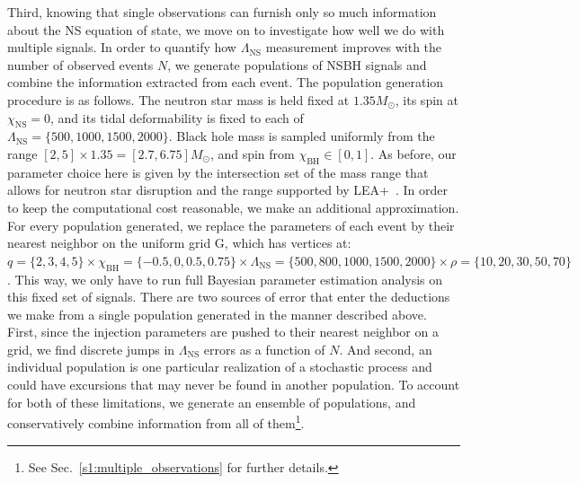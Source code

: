 \documentclass[aps,prd,amsmath,floats,floatfix, twocolumn,
superscriptaddress,nofootinbib,showpacs]{revtex4-1}
\newcommand{\prayush}{\textcolor{red!40!black}}
\newcommand{\lambdans}{\Lambda_\mathrm{NS}}
\newcommand{\chibh}{\chi_\mathrm{BH}}
\newcommand{\chins}{\chi_\mathrm{NS}}
\begin{document}
Third, knowing that single observations can furnish only so much information
about the NS equation of state, we move on to investigate how well we do with
multiple signals. In order to quantify how $\lambdans$ measurement improves
with the number of observed events $N$, we generate populations of NSBH signals
and combine the information extracted from each event.
% 
The population generation procedure is as follows. The neutron star mass is
held fixed at $1.35M_\odot$, its spin at $\chins=0$, and its tidal
deformability is fixed to each of $\lambdans=\{500,1000,1500,2000\}$. Black hole
mass is sampled uniformly from the range $[2,5]\times 1.35=[2.7, 6.75]M_\odot$,
and spin from $\chibh\in[0,1]$. As before, our parameter choice here is given
by the intersection set of the mass range that allows for neutron star disruption
and the range supported by LEA+~\cite{Foucart2012,Foucart:2013a,Lackey:2013axa}.
In order to keep the computational cost reasonable, we make an additional
approximation. For every population generated, we replace the parameters of each
event by their nearest neighbor on the uniform grid G, which has vertices
at: $q=\{2,3,4,5\}\times\chibh=\{-0.5,0,0.5,0.75\}\times\lambdans=\{500,800,
1000,1500,2000\}\times\rho=\{10,20,30,50,70\}$.
% 
This way, we only have to run full Bayesian parameter estimation analysis on
this fixed set of signals. 
% 
There are two sources of error that enter the deductions we make from
a single population generated in the manner described above. First, since the
injection parameters are pushed to their nearest neighbor on a grid, we
find discrete jumps in $\lambdans$ errors as a function of $N$. And second, an
individual population is one particular realization of a stochastic process and
could have excursions that may never be found in another population. To
account for both of these limitations, we generate an ensemble of populations,
and conservatively combine information from all of them\footnote{See 
Sec.~\ref{s1:multiple_observations} for further details.}.
\end{document}

